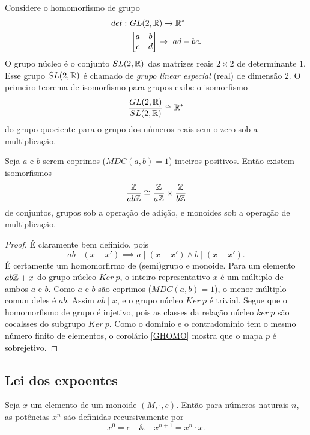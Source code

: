 \begin{definition}[Magma]
      \begin{exmp}
         Considere o homomorfismo de grupo  
         \begin{alignat}{2}
            det:\ &GL(2,\mathbb{R}) \to \mathbb{R}^{*}\nonumber\\
            &\begin{bmatrix}
               a & b\\
               c & d
            \end{bmatrix} \mapsto\ ad - bc.
            \nonumber
         \end{alignat}
         O grupo núcleo é o conjunto $SL(2,\mathbb{R})$ das matrizes reais $2 \times 2$ de determinante $1$. Esse grupo $SL(2,\mathbb{R})$ é chamado de \emph{grupo linear especial} (real) de dimensão $2$. O primeiro teorema de isomorfismo para grupos exibe o isomorfismo
         $$\dfrac{GL(2,\mathbb{R})}{SL(2,\mathbb{R})} \cong \mathbb{R}^{*}$$ do grupo quociente para o grupo dos números reais sem o zero sob a multiplicação.
      \end{exmp}
      \begin{theorem}
         Seja $a$ e $b$ serem coprimos ($MDC(a,b) = 1$) inteiros positivos. Então existem isomorfismos $$\dfrac{\mathbb{Z}}{ab\mathbb{Z}} \cong \dfrac{\mathbb{Z}}{a\mathbb{Z}} \times \dfrac{\mathbb{Z}}{b\mathbb{Z}}$$ de conjuntos, grupos sob a operação de adição, e monoides sob a operação de multiplicação.
         \begin{proof}
            É claramente bem definido, pois $$ab \mid (x - x') \implies a \mid (x - x') \wedge b \mid (x - x').$$ É certamente um homomorfirmo de (semi)grupo e monoide. Para um elemento $ab\mathbb{Z} + x$ do grupo núcleo $Ker\ p$, o inteiro representativo $x$ é um múltiplo de ambos $a$ e $b$. Como $a$ e $b$ são coprimos ($MDC(a,b) = 1$), o menor múltiplo comun deles é $ab$. Assim $ab \mid x$, e o grupo núcleo $Ker\ p$ é trivial. Segue que o homomorfismo de grupo é injetivo, pois as classes da relação núcleo $ker\ p$ são cocalsses do subgrupo $Ker\ p$. Como o domínio e o contradomínio tem o mesmo número finito de elementos, o corolário \ref{GHOMO} mostra que o mapa $p$ é sobrejetivo.
         \end{proof}
      \end{theorem}

   \subsection{Lei dos expoentes}
      Seja $x$ um elemento de um monoide $(M, \cdot, e)$. Então para números naturais $n$, as potências $x^n$ são definidas recursivamente por
      \begin{equation}\label{RECEXPO}
         x^{0} = e\quad \&\quad x^{n+1}=x^{n} \cdot x.  
      \end{equation}


\end{definition}
